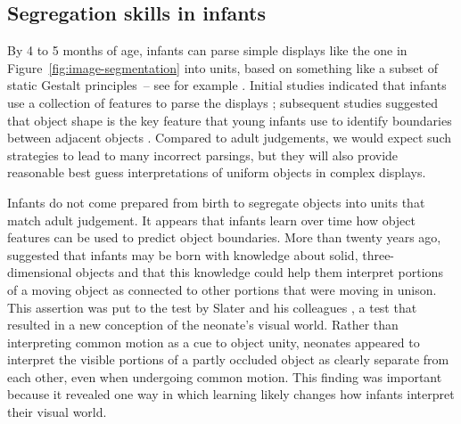 


\subsection{Segregation skills in infants}

\label{sect:infant-skills}


%
By 4 to 5 months of age, infants can
parse simple displays like the one in 
Figure~\ref{fig:image-segmentation}
 into units, based on something like 
a subset of static
Gestalt principles~--
 see for example .
%
%
%
Initial studies indicated that infants use a collection of
features to parse the displays \cite{needham98infants,needham97object,needham98effects}; subsequent studies suggested that object shape is the key
feature that young infants use to identify boundaries between adjacent
objects \cite{needham99role}.
%
%
Compared to adult judgements,
%
we would expect such strategies to lead to many incorrect parsings, 
but they will
also provide reasonable best guess interpretations of uniform objects
in complex displays.  



Infants do not come prepared from birth to segregate objects into 
units that match adult judgement.
%
%
It appears that infants learn over time how object
features can be used to predict object boundaries.  More than twenty
years ago,  suggested that infants may be born
with knowledge about solid, three-dimensional objects and that this
knowledge could help them interpret portions of a moving object as
connected to other portions that were moving in unison.  This
assertion was put to the test by Slater and his colleagues 
\cite{slater90newborn}, a test that resulted in a new conception of
the neonate's visual world.  Rather than interpreting common motion as
a cue to object unity, neonates appeared to interpret the visible portions of a
partly occluded object as clearly separate from each other, even when
undergoing common motion.  This finding was important because it
revealed one way in which learning likely changes how infants
interpret their visual world.


